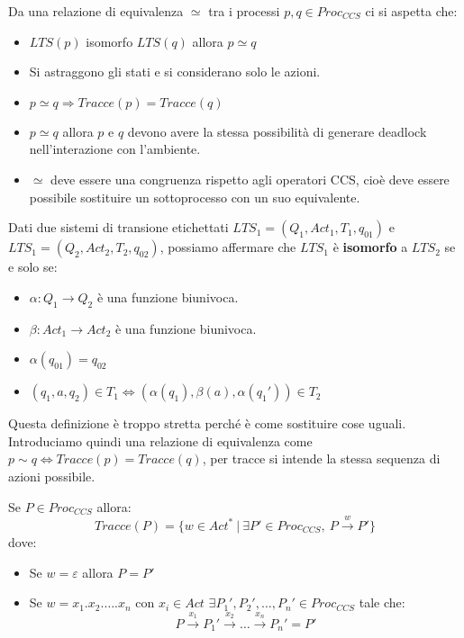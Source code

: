 Da una relazione di equivalenza $\simeq$ tra i processi $p, q \in Proc_{CCS}$ ci
si aspetta che:
\begin{itemize}
    \item $LTS(p)$ isomorfo $LTS(q)$ allora $p \simeq q$
    \item Si astraggono gli stati e si considerano solo le azioni.
    \item $p \simeq q \Rightarrow Tracce(p) = Tracce(q)$
    \item $p \simeq q$ allora $p$ e $q$ devono avere la stessa possibilità di
          generare deadlock nell'interazione con l'ambiente.
    \item $\simeq$ deve essere una congruenza rispetto agli operatori CCS, cioè
          deve essere possibile sostituire un sottoprocesso con un suo equivalente.
\end{itemize}
\begin{definizione}
    Dati due sistemi di transione etichettati $LTS_1 = (Q_1, Act_1, T_1, q_{01})$
    e $LTS_1 = (Q_2, Act_2, T_2, q_{02})$, possiamo affermare che
    $LTS_1$ è \textbf{isomorfo} a $LTS_2$ se e solo se:
    \begin{itemize}
        \item $\alpha: Q_1 \to Q_2$ è una funzione biunivoca.
        \item $\beta: Act_1 \to Act_2$ è una funzione biunivoca.
        \item $\alpha(q_{01}) = q_{02}$
        \item $(q_1, a, q_2) \in T_1 \iff (\alpha(q_1), \beta(a), \alpha(q_1'))
                  \in T_2$
    \end{itemize}
\end{definizione}
Questa definizione è troppo stretta perché è come sostituire cose uguali.
Introduciamo quindi una relazione di equivalenza come $p \sim q \iff Tracce(p) =
    Tracce(q)$, per tracce si intende la stessa sequenza di azioni possibile.
\begin{definizione}
    Se $P \in Proc_{CCS}$ allora:
    \begin{equation}
        Tracce(P) = \{w \in Act^* \ | \ \exists P' \in Proc_{CCS}, \
        P \xrightarrow{w} P'\}
    \end{equation}
    dove:
    \begin{itemize}
        \item Se $w = \varepsilon$ allora $P =  P'$
        \item Se $w = x_1 . x_2 . \dots . x_n$ con $x_i \in Act$
              $\exists P_1', P_2', \dots, P_n' \in Proc_{CCS}$ tale che:
              \begin{equation}
                  P \xrightarrow{x_1} P_1' \xrightarrow{x_2} \dots
                  \xrightarrow{x_n} P_n' = P'
              \end{equation}
    \end{itemize}
\end{definizione}

